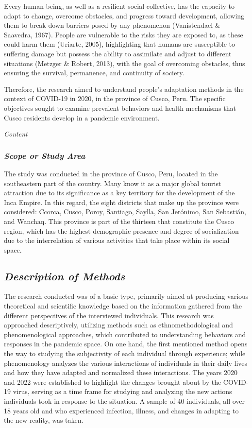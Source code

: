 \documentclass{article}
\begin{document}
Every human being, as well as a resilient social collective, has the capacity to adapt to change, overcome obstacles, and progress toward development, allowing them to break down barriers posed by any phenomenon (Vanistendael \& Saavedra, 1967). People are vulnerable to the risks they are exposed to, as these could harm them (Uriarte, 2005), highlighting that humans are susceptible to suffering damage but possess the ability to assimilate and adjust to different situations (Metzger \& Robert, 2013), with the goal of overcoming obstacles, thus ensuring the survival, permanence, and continuity of society.

Therefore, the research aimed to understand people's adaptation methods in the context of COVID-19 in 2020, in the province of Cusco, Peru. The specific objectives sought to examine prevalent behaviors and health mechanisms that Cusco residents develop in a pandemic environment.

\textit{Content}

\subsubsection{\textit{Scope or Study Area}}

The study was conducted in the province of Cusco, Peru, located in the southeastern part of the country. Many know it as a major global tourist attraction due to its significance as a key territory for the development of the Inca Empire. In this regard, the eight districts that make up the province were considered: Ccorca, Cusco, Poroy, Santiago, Saylla, San Jerónimo, San Sebastián, and Wanchaq. This province is part of the thirteen that constitute the Cusco region, which has the highest demographic presence and degree of socialization due to the interrelation of various activities that take place within its social space.

\subsection{\textit{Description of Methods}}

The research conducted was of a basic type, primarily aimed at producing various theoretical and scientific knowledge based on the information gathered from the different perspectives of the interviewed individuals. This research was approached descriptively, utilizing methods such as ethnomethodological and phenomenological approaches, which contributed to understanding behaviors and responses in the pandemic space. On one hand, the first mentioned method opens the way to studying the subjectivity of each individual through experience; while phenomenology analyzes the various interactions of individuals in their daily lives and how they have adapted and normalized these interactions. The years 2020 and 2022 were established to highlight the changes brought about by the COVID-19 virus, serving as a time frame for studying and analyzing the new actions individuals took in response to the situation. A sample of 40 individuals, all over 18 years old and who experienced infection, illness, and changes in adapting to the new reality, was taken.
\end{document}
